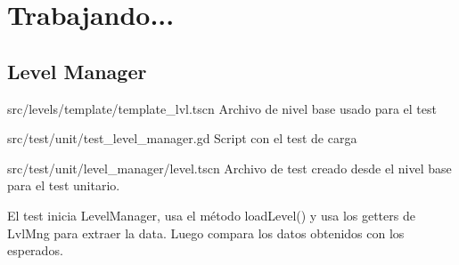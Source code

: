 
\section{Trabajando...}\label{Trabajando}

\subsection{Level Manager}

src/levels/template/template\_lvl.tscn Archivo de nivel base usado para el test

src/test/unit/test\_level\_manager.gd Script con el test de carga

src/test/unit/level\_manager/level.tscn Archivo de test creado desde el nivel base para el test unitario.

El test inicia LevelManager, usa el método loadLevel() y usa los getters de LvlMng para extraer la data. Luego compara los datos obtenidos con los esperados.



